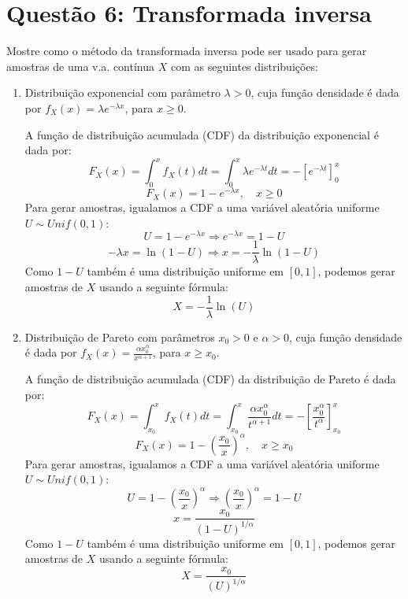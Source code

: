 \documentclass[12 pt]{article}
\begin{document}
\section*{Questão 6: Transformada inversa}

Mostre como o método da transformada inversa pode ser usado para gerar amostras de uma v.a. contínua $X$ com as seguintes distribuições:

\begin{enumerate}
    \item Distribuição exponencial com parâmetro $\lambda > 0$, cuja função densidade é dada por $f_X(x) = \lambda e^{-\lambda x}$, para $x \geq 0$.
    \begin{tcolorbox}[colframe=black, title=Resposta:]
        A função de distribuição acumulada (CDF) da distribuição exponencial é dada por:
        $$
        F_X(x) = \int_0^x f_X(t) dt = \int_0^x \lambda e^{-\lambda t} dt = -\left[e^{-\lambda t}\right]_0^x
        $$
        $$
        F_X(x) = 1 - e^{-\lambda x}, \quad x \geq 0
        $$
        Para gerar amostras, igualamos a CDF a uma variável aleatória uniforme $U \sim Unif(0, 1)$:
        $$
        U =  1 - e^{-\lambda x} \Rightarrow e^{-\lambda x} = 1-U 
        $$
        $$
        -\lambda x = \ln(1-U) \Rightarrow x = -\frac{1}{\lambda} \ln(1-U)
        $$
        Como $1-U$ também é uma distribuição uniforme em $[0,1]$, podemos gerar amostras de $X$ usando a seguinte fórmula:
        $$
        \boxed{X = -\frac{1}{\lambda} \ln(U)}
        $$

    \end{tcolorbox}
    \item Distribuição de Pareto com parâmetros $x_0 > 0$ e $\alpha > 0$, cuja função densidade é dada por $f_X(x) = \frac{\alpha x_0^\alpha}{x^{\alpha + 1}}$, para $x \geq x_0$.
    \begin{tcolorbox}[colframe=black, title=Resposta:]
        A função de distribuição acumulada (CDF) da distribuição de Pareto é dada por:
        $$
        F_X(x) = \int_{x_0}^x f_X(t) dt = \int_{x_0}^x \frac{\alpha x_0^\alpha}{t^{\alpha + 1}} dt = -\left[\frac{x_0^\alpha}{t^\alpha}\right]_{x_0}^x
        $$
        $$
        F_X(x) = 1 - \left(\frac{x_0}{x}\right)^\alpha, \quad x \geq x_0
        $$
        Para gerar amostras, igualamos a CDF a uma variável aleatória uniforme $U \sim Unif(0, 1)$:
        $$
        U = 1 - \left(\frac{x_0}{x}\right)^\alpha \Rightarrow \left(\frac{x_0}{x}\right)^\alpha = 1-U 
        $$
        $$
        x = \frac{x_0}{(1-U)^{1/\alpha}}
        $$
        Como $1-U$ também é uma distribuição uniforme em $[0,1]$, podemos gerar amostras de $X$ usando a seguinte fórmula:
        $$
        \boxed{X = \frac{x_0}{(U)^{1/\alpha}}}
        $$

    \end{tcolorbox}
\end{enumerate}
\end{document}
